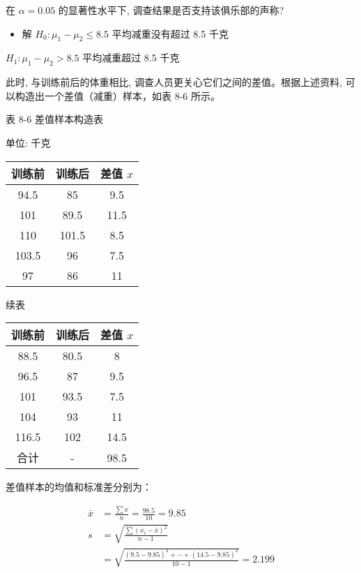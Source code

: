 \documentclass[10pt]{article}
\begin{document}
\begin{CJK*}{UTF8}{bsmi}
在 $\alpha=0.05$ 的显著性水平下, 调查结果是否支持该俱乐部的声称?

\begin{itemize}
  \item 解 $H_{0}: \mu_{1}-\mu_{2} \leqslant 8.5$ 平均减重没有超过 8.5 千克
\end{itemize}

$H_{1}: \mu_{1}-\mu_{2}>8.5$ 平均减重超过 8.5 千克

此时, 与训练前后的体重相比, 调查人员更关心它们之间的差值。根据上述资料, 可以构造出一个差值（减重）样本，如表 8-6 所示。

表 8-6 差值样本构造表

单位: 千克

\begin{center}
\begin{tabular}{ccc}
\hline
训练前 & 训练后 & 差值 $x$ \\
\hline
94.5 & 85 & 9.5 \\
101 & 89.5 & 11.5 \\
110 & 101.5 & 8.5 \\
103.5 & 96 & 7.5 \\
97 & 86 & 11 \\
\hline
\end{tabular}
\end{center}

续表

\begin{center}
\begin{tabular}{ccc}
\hline
训练前 & 训练后 & 差值 $x$ \\
\hline
88.5 & 80.5 & 8 \\
96.5 & 87 & 9.5 \\
101 & 93.5 & 7.5 \\
104 & 93 & 11 \\
116.5 & 102 & 14.5 \\
\hline
合计 & - & 98.5 \\
\hline
\end{tabular}
\end{center}

差值样本的均值和标准差分别为：

$$
\begin{aligned}
\bar{x} & =\frac{\sum x}{n}=\frac{98.5}{10}=9.85 \\
s & =\sqrt{\frac{\sum\left(x_{i}-\bar{x}\right)^{2}}{n-1}} \\
& =\sqrt{\frac{(9.5-9.85)^{2}+\cdots+(14.5-9.85)^{2}}{10-1}}=2.199
\end{aligned}
$$


\end{CJK*}
\end{document}
